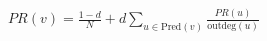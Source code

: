 \documentclass[preview]{standalone}
\begin{document}
\begin{align*}
PR(v) = \frac{1-d}{N} + d \sum_{u \in \text{Pred}(v)} \frac{PR(u)}{\text{outdeg}(u)}
\end{align*}
\end{document}
